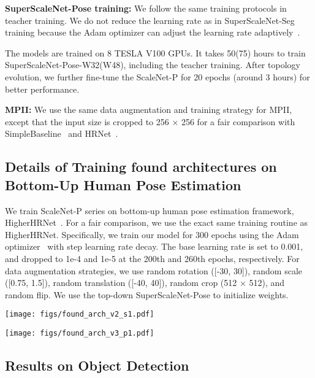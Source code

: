 \documentclass[final]{cvpr}
\newcommand{\netname}{ScaleNet\xspace}
\newcommand{\supernet}{SuperScaleNet\xspace}
\begin{document}
\textbf{SuperScaleNet-Pose training:} We follow the same training protocols in teacher training. We do not reduce the learning rate as in SuperScaleNet-Seg training because the Adam optimizer can adjust the learning rate adaptively~\cite{kingma2014adam}. 

The models are trained on 8 TESLA V100 GPUs. It takes 50(75) hours to train \supernet-Pose-W32(W48), including the teacher training. After topology evolution, we further fine-tune the \netname-P for 20 epochs (around 3 hours) for better performance.

\textbf{MPII:} We use the same data augmentation and training strategy for MPII, except that the input size is cropped to 256 × 256 for a fair comparison with SimpleBaseline~\cite{xiao2018simple} and HRNet~\cite{sun2019deep}.

\subsection{Details of Training found architectures on Bottom-Up Human Pose Estimation}
We train \netname-P series on bottom-up human pose estimation framework, HigherHRNet~\cite{cheng2020higherhrnet}. For a fair comparison, we use the exact same training routine as HigherHRNet. Specifically, we train our model for 300 epochs using the Adam optimizer~\cite{kingma2014adam} with step learning rate decay. The base learning rate is set to 0.001, and dropped to 1e-4 and 1e-5 at the 200th and 260th epochs, respectively. For data augmentation strategies, we use random rotation ([-30, 30]), random scale ([0.75, 1.5]), random translation ([-40, 40]), random crop (512 × 512), and random flip. We use the top-down SuperScaleNet-Pose to initialize weights.

\begin{figure*}
    \centering
    \texttt{[image: figs/found\_arch\_v2\_s1.pdf]}
    \caption{The full model of \netname-S1.}
    \label{fig:full_s1}
\end{figure*}
\begin{figure*}
    \centering
    \texttt{[image: figs/found\_arch\_v3\_p1.pdf]}
    \caption{The full model of \netname-P1.}
    \label{fig:full_p1}
\end{figure*}

\subsection{Results on Object Detection}
\end{document}
